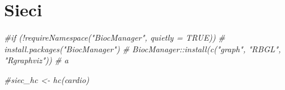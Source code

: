 \documentclass[
]{article}
\newenvironment{Shaded}{\begin{snugshade}}{\end{snugshade}}
\newcommand{\CommentTok}[1]{\textcolor[rgb]{0.56,0.35,0.01}{\textit{#1}}}
\begin{document}
\section{Sieci}\label{sieci}

\begin{Shaded}
\begin{Highlighting}[]
 \CommentTok{\#if (!requireNamespace("BiocManager", quietly = TRUE))}
 \CommentTok{\#  install.packages("BiocManager")}
\CommentTok{\# BiocManager::install(c("graph", "RBGL", "Rgraphviz"))}
\CommentTok{\# a}
\end{Highlighting}
\end{Shaded}

\begin{Shaded}
\begin{Highlighting}[]
\CommentTok{\#siec\_hc \textless{}{-} hc(cardio)}
\end{Highlighting}
\end{Shaded}
\end{document}
